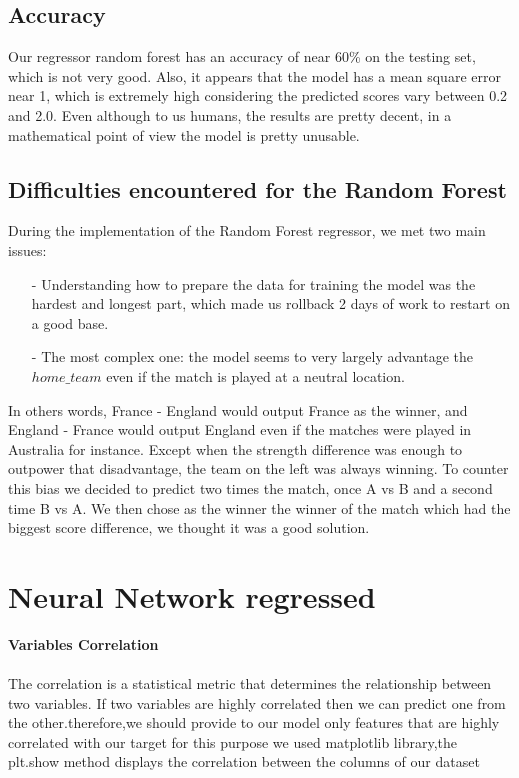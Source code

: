 \subsection{Accuracy}
Our regressor random forest has an accuracy of near 60\% on the testing set, which is not very good.
Also, it appears that the model has a mean square error near 1, which is extremely high considering the predicted scores vary between 0.2 and 2.0.
Even although to us humans, the results are pretty decent, in a mathematical point of view the model is pretty unusable.
\subsection{Difficulties encountered for the Random Forest}
During the implementation of the Random Forest regressor, we met two main issues:
 \begin{itemize}
    \item[-] Understanding how to prepare the data for training the model was the hardest and longest part, which made us rollback 2 days of work to restart on a good base.
    \item[-] The most complex one: the model seems to very largely advantage the $home\_team$ even if the match is played at a neutral location.

\end{itemize}
	In others words, France - England would output France as the winner, and England - France would output England even if the matches were played in Australia for instance.
	Except when the strength difference was enough to outpower that disadvantage, the team on the left was always winning.
	To counter this bias we decided to predict two times the match, once A vs B and a second time B vs A. We then chose as the winner the winner of the match which had the biggest score difference, we thought it was a good solution.
\newpage
\section{Neural Network regressed}


\textbf{Variables Correlation}\\
\\
The correlation is a statistical metric that determines the relationship between two variables. If two variables are highly correlated then we can predict one from the other.therefore,we should provide to our model only features that are highly correlated with our target
for this purpose we used matplotlib library,the plt.show method displays the correlation between the columns of our dataset

